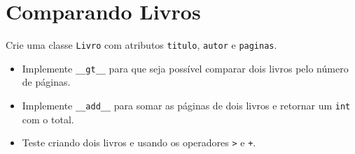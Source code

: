 \section{Comparando Livros}
Crie uma classe \texttt{Livro} com atributos \texttt{titulo}, \texttt{autor} e \texttt{paginas}.
\begin{itemize}
    \item Implemente \texttt{\_\_gt\_\_} para que seja possível comparar dois livros pelo número de páginas.
    \item Implemente \texttt{\_\_add\_\_} para somar as páginas de dois livros e retornar um \texttt{int} com o total.
    \item Teste criando dois livros e usando os operadores \texttt{>} e \texttt{+}.
\end{itemize}


